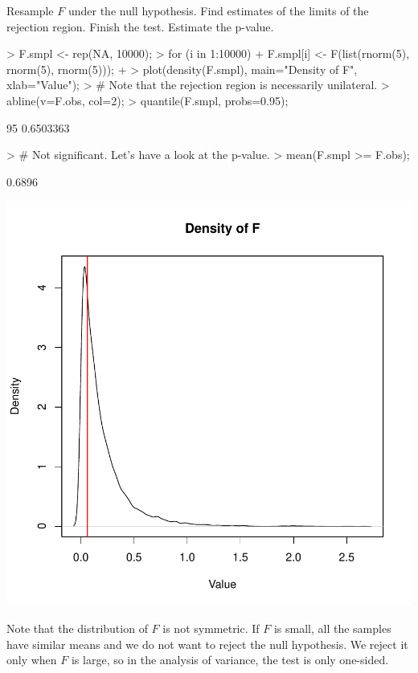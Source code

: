 \documentclass[a4paper]{article}
\theoremstyle{definition}
\begin{document}
\begin{Exercise}
Resample $F$ under the null hypothesis. Find estimates of the limits of
the rejection region. Finish the test. Estimate the p-value.
\end{Exercise}
\begin{Answer}
\begin{Schunk}
\begin{Sinput}
> F.smpl <- rep(NA, 10000);
> for (i in 1:10000) {
+   F.smpl[i] <- F(list(rnorm(5), rnorm(5), rnorm(5)));
+ }
> plot(density(F.smpl), main="Density of F", xlab="Value");
> # Note that the rejection region is necessarily unilateral.
> abline(v=F.obs, col=2);
> quantile(F.smpl, probs=0.95);
\end{Sinput}
\begin{Soutput}
      95%
0.6503363 
\end{Soutput}
\begin{Sinput}
> # Not significant. Let's have a look at the p-value.
> mean(F.smpl >= F.obs);
\end{Sinput}
\begin{Soutput}
[1] 0.6896
\end{Soutput}
\end{Schunk}
\includegraphics{anova-004}
\par
Note that the distribution of $F$ is not symmetric. If $F$ is small,
all the samples have similar means and we do not want to reject the null
hypothesis. We reject it only when $F$ is large, so in the analysis of
variance, the test is only one-sided.
\end{Answer}
\end{document}
